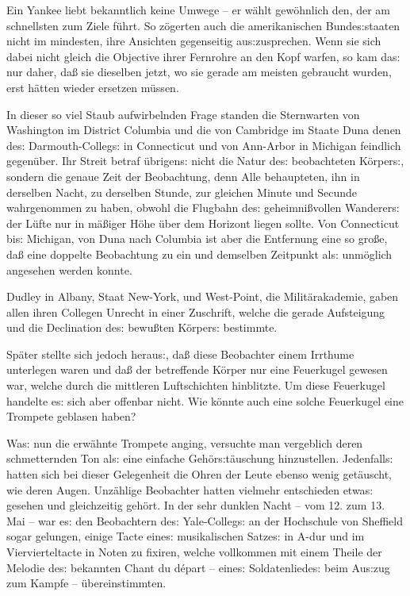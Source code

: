 \documentclass[oneside,12pt]{book}
\newenvironment{antiqua}{\normalfont}{}
\newcommand{\s}{s:}
\begin{document}
Ein Yankee liebt bekanntlich keine Umwege -- er w\"ahlt gew\"ohnlich
den, der am schnellsten zum Ziele f\"uhrt. So z\"ogerten auch die
amerikanischen Bunde{\s}staaten nicht im mindesten, ihre Ansichten
gegenseitig au{\s}zusprechen. Wenn sie sich dabei nicht gleich die
Objective ihrer Fernrohre an den Kopf warfen, so kam da{\s} nur
daher, da{\ss} sie dieselben jetzt, wo sie gerade am meisten
gebraucht wurden, erst h\"atten wieder ersetzen m\"ussen.

In dieser so viel Staub aufwirbelnden Frage standen die Sternwarten
von Washington im District Columbia und die von Cambridge im Staate
Duna denen de{\s} Darmouth-Colleg{\s} in Connecticut und von
Ann-Arbor in Michigan feindlich gegen\"uber. Ihr Streit betraf
\"ubrigen{\s} nicht die Natur de{\s} beobachteten K\"orper{\s},
sondern die genaue Zeit der Beobachtung, denn Alle behaupteten, ihn
in derselben Nacht, zu derselben Stunde, zur gleichen Minute und
Secunde wahrgenommen zu haben, obwohl die Flugbahn de{\s}
geheimni{\ss}vollen Wanderer{\s} der L\"ufte nur in m\"a{\ss}iger
H\"ohe \"uber dem Horizont liegen sollte. Von Connecticut bi{\s}
Michigan, von Duna nach Columbia ist aber die Entfernung eine so
gro{\ss}e, da{\ss} eine doppelte Beobachtung zu ein und demselben
Zeitpunkt al{\s} unm\"oglich angesehen werden konnte.

Dudley in Albany, Staat New-York, und West-Point, die
Milit\"arakademie, gaben allen ihren Collegen Unrecht in einer
Zuschrift, welche die gerade Aufsteigung und die Declination de{\s}
bewu{\ss}ten K\"orper{\s} bestimmte.

Sp\"ater stellte sich jedoch herau{\s}, da{\ss} diese Beobachter
einem Irrthume unterlegen waren und da{\ss} der betreffende K\"orper
nur eine Feuerkugel gewesen war, welche durch die mittleren
Luftschichten hinblitzte. Um diese Feuerkugel handelte e{\s} sich
aber offenbar nicht. Wie k\"onnte auch eine solche Feuerkugel eine
Trompete geblasen haben?

Wa{\s} nun die erw\"ahnte Trompete anging, versuchte man vergeblich
deren schmetternden Ton al{\s} eine einfache Geh\"or{\s}t\"auschung
hinzustellen. Jedenfall{\s} hatten sich bei dieser Gelegenheit die
Ohren der Leute ebenso wenig get\"auscht, wie deren Augen.
Unz\"ahlige Beobachter hatten vielmehr entschieden etwa{\s} gesehen
und gleichzeitig geh\"ort. In der sehr dunklen Nacht -- vom 12. zum
13. Mai -- war e{\s} den Beobachtern de{\s} Yale-Colleg{\s} an der
Hochschule von Sheffield sogar gelungen, einige Tacte eine{\s}
musikalischen Satze{\s} in \begin{antiqua}A-dur\end{antiqua} und im
Viervierteltacte in Noten zu fixiren, welche vollkommen mit einem
Theile der Melodie de{\s} bekannten \begin{antiqua}Chant du
d\'epart\end{antiqua} -- eine{\s} Soldatenliede{\s} beim Au{\s}zug
zum Kampfe -- \"ubereinstimmten.
\end{document}
